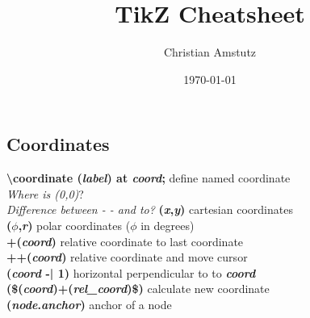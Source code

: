 \documentclass[10pt]{article}
\title{TikZ Cheatsheet}
\author{Christian Amstutz}
\date{\today}
\newcommand{\tikzcmd}[1]{\textbf{#1}}
\newcommand{\tikzparam}[1]{\textbf{\emph{#1}}}
\begin{document}
    \maketitle

    \begin{multicols}{2}

        \section{Coordinates}
        \tikzcmd{\textbackslash coordinate (\tikzparam{label}) at \tikzparam{coord};} define named coordinate\\
        \emph{Where is (0,0)}?\\
        \emph{Difference between - - and to?}
        \tikzcmd{(\tikzparam{x},\tikzparam{y})} cartesian coordinates\\
        \tikzcmd{(\tikzparam{$\phi$},\tikzparam{r})} polar coordinates ($\phi$ in degrees)\\
        \tikzcmd{+(\tikzparam{coord})} relative coordinate to last coordinate\\
        \tikzcmd{++(\tikzparam{coord})} relative coordinate and move cursor\\
        \tikzcmd{(\tikzparam{coord} -| 1)} horizontal perpendicular to to \tikzparam{coord}\\
        \tikzcmd{(\$(\tikzparam{coord})+(\tikzparam{rel\_coord})\$)} calculate new coordinate \\
        \tikzcmd{(\tikzparam{node}.\tikzparam{anchor})} anchor of a node


\end{multicols}
\end{document}
